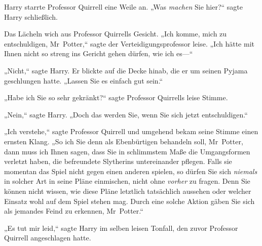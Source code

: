 Harry starrte Professor Quirrell eine Weile an. „Was \emph{machen} Sie hier?“ sagte Harry schließlich.

Das Lächeln wich aus Professor Quirrells Gesicht. „Ich komme, mich zu entschuldigen, Mr~Potter,“ sagte der Verteidigungsprofessor leise. „Ich hätte mit Ihnen nicht so streng ins Gericht gehen dürfen, wie ich es—“

„Nicht,“ sagte Harry. Er blickte auf die Decke hinab, die er um seinen Pyjama geschlungen hatte. „Lassen Sie es einfach gut sein.“

„Habe ich Sie so sehr gekränkt?“ sagte Professor Quirrells leise Stimme.

„Nein,“ sagte Harry. „Doch das werden Sie, wenn Sie sich jetzt entschuldigen.“

„Ich verstehe,“ sagte Professor Quirrell und umgehend bekam seine Stimme einen ernsten Klang. „So ich Sie denn als Ebenbürtigen behandeln soll, Mr~Potter, dann muss ich Ihnen sagen, dass Sie in schlimmstem Maße die Umgangsformen verletzt haben, die befreundete Slytherins untereinander pflegen. Falls sie momentan das Spiel nicht gegen einen anderen spielen, so dürfen Sie sich \emph{niemals} in solcher Art in seine Pläne einmischen, nicht ohne \emph{vorher} zu fragen. Denn Sie können nicht wissen, wie diese Pläne letztlich tatsächlich aussehen oder welcher Einsatz wohl auf dem Spiel stehen mag. Durch eine solche Aktion gäben Sie sich als jemandes Feind zu erkennen, Mr~Potter.“

„Es tut mir leid,“ sagte Harry im selben leisen Tonfall, den zuvor Professor Quirrell angeschlagen hatte.

